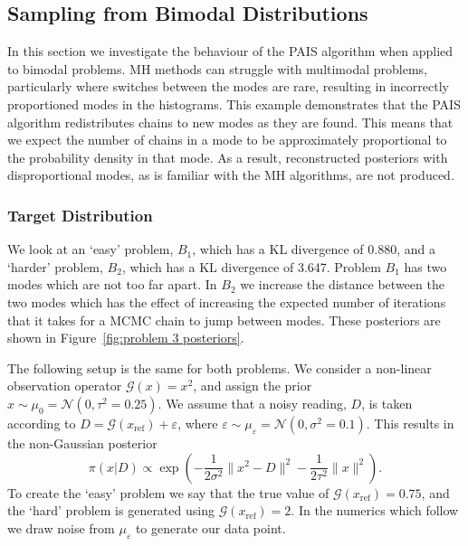 \documentclass[final]{siamltex}
\newcommand{\G}{\mathcal{G}}
\newcommand{\N}{\mathcal{N}}
\begin{document}
\subsection{Sampling from Bimodal Distributions}

In this section we investigate the behaviour of the PAIS algorithm
when applied to bimodal problems. MH methods can
struggle with multimodal problems, particularly where switches between
the modes are rare, resulting in incorrectly proportioned modes in the
histograms. This example demonstrates that the PAIS algorithm redistributes 
chains to new modes as they are found. This means that we expect the number of chains in a mode to be
approximately proportional to the probability density in that mode. As a result, reconstructed posteriors with disproportional modes, as is familiar with the MH algorithms, are not produced.

\subsubsection{Target Distribution} \label{sec:tar}
We look at an `easy' problem, $B_1$, which has a KL divergence of
0.880, and a `harder' problem, $B_2$, which has a KL divergence of
3.647. Problem $B_1$ has two modes which are not too far apart. In
$B_2$ we increase the distance between the two modes which has the
effect of increasing the expected number of iterations that it takes
for a MCMC chain to jump between modes. These posteriors are shown in Figure~\ref{fig:problem 3 posteriors}.

The following setup is the same for both problems. We consider a
non-linear observation operator $\G(x) = x^2$, and assign the prior
$x \sim \mu_0 = \N(0, \tau^2=0.25)$. We assume that a noisy reading,
$D$, is taken according to $D = \G(x_\text{ref}) + \varepsilon$, where
$\varepsilon \sim \mu_\varepsilon = \N(0, \sigma^2 = 0.1)$. This results
in the non-Gaussian posterior
\[
	\pi(x|D) \propto \exp\left(-\frac{1}{2\sigma^2}\|x^2 - D\|^2 - \frac{1}{2\tau^2}\|x\|^2\right).
\]
To create the `easy' problem we say that the true value of
$\G(x_\text{ref}) = 0.75$, and the `hard' problem is generated using
$\G(x_\text{ref}) = 2$. In the numerics which follow we draw noise from
$\mu_\varepsilon$ to generate our data point.
\end{document}
